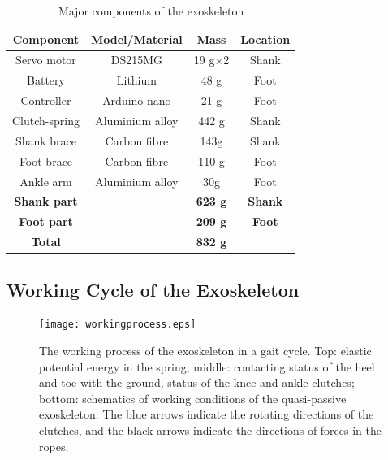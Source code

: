 \documentclass[twocolumn,cleanfoot,10pt]{asme2ej}
\begin{document}
\begin{table}[t]
	\caption{Major components of the exoskeleton}
	\begin{center}
		\label{tab:hardware}
		\begin{tabular}{c c c c}	
			\hline
			\textbf{Component} & \textbf{Model/Material} & \textbf{Mass} & \textbf{Location} \\
			\hline
			Servo motor & DS215MG & 19 g$\times$2 & Shank\\
			Battery & Lithium & 48 g & Foot\\
			Controller & Arduino nano & 21 g & Foot\\
			Clutch-spring & Aluminium alloy & 442 g & Shank\\
			Shank brace & Carbon fibre & 143g & Shank\\
			Foot brace & Carbon fibre & 110 g & Foot\\
			Ankle arm & Aluminium alloy & 30g & Foot\\			
			\hline 
			\textbf{Shank part} & & \textbf{623 g} & \textbf{Shank}\\
			\textbf{Foot part} & & \textbf{209 g} & \textbf{Foot}\\
			\hline
			\textbf{Total} & & \textbf{832 g} & \\
			\hline
		\end{tabular}
	\end{center}
\end{table}


\subsection{Working Cycle of the Exoskeleton}
\label{subsec:Working process}

\begin{figure}[tb]
	\centering
	\texttt{[image: workingprocess.eps]}
	\caption{The working process of the exoskeleton in a gait cycle.
	Top: elastic potential energy in the spring; middle: contacting status of the heel and toe with the ground, status of the knee and ankle clutches; bottom: schematics of working conditions of the quasi-passive exoskeleton.
	The blue arrows indicate the rotating directions of the clutches, and the black arrows indicate the directions of forces in the ropes.}
	\label{fig:workprocess}   
\end{figure}
\end{document}
